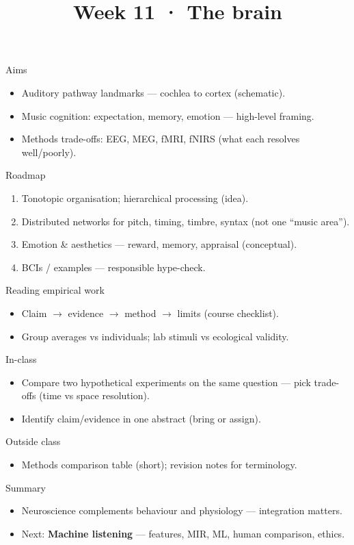 \documentclass[aspectratio=169]{beamer}
\title{Week 11 · The brain}
\subtitle{\coursename}
\institute{\instituteuo}
\date{}
\begin{document}
\begin{frame}
  \titlepage
\end{frame}

\begin{frame}{Aims}
  \begin{itemize}
    \item Auditory pathway landmarks — cochlea to cortex (schematic).
    \item Music cognition: expectation, memory, emotion — high-level framing.
    \item Methods trade-offs: EEG, MEG, fMRI, fNIRS (what each resolves well/poorly).
  \end{itemize}
\end{frame}

\begin{frame}{Roadmap}
  \begin{enumerate}
    \item Tonotopic organisation; hierarchical processing (idea).
    \item Distributed networks for pitch, timing, timbre, syntax (not one ``music area'').
    \item Emotion \& aesthetics — reward, memory, appraisal (conceptual).
    \item BCIs / examples — responsible hype-check.
  \end{enumerate}
\end{frame}

\begin{frame}{Reading empirical work}
  \begin{itemize}
    \item Claim $\rightarrow$ evidence $\rightarrow$ method $\rightarrow$ limits (course checklist).
    \item Group averages vs individuals; lab stimuli vs ecological validity.
  \end{itemize}
\end{frame}

\begin{frame}{In-class}
  \begin{itemize}
    \item Compare two hypothetical experiments on the same question — pick trade-offs (time vs space resolution).
    \item Identify claim/evidence in one abstract (bring or assign).
  \end{itemize}
\end{frame}

\begin{frame}{Outside class}
  \begin{itemize}
    \item Methods comparison table (short); revision notes for terminology.
  \end{itemize}
\end{frame}

\begin{frame}{Summary}
  \begin{itemize}
    \item Neuroscience complements behaviour and physiology — integration matters.
    \item Next: \textbf{Machine listening} — features, MIR, ML, human comparison, ethics.
  \end{itemize}
\end{frame}
\end{document}
